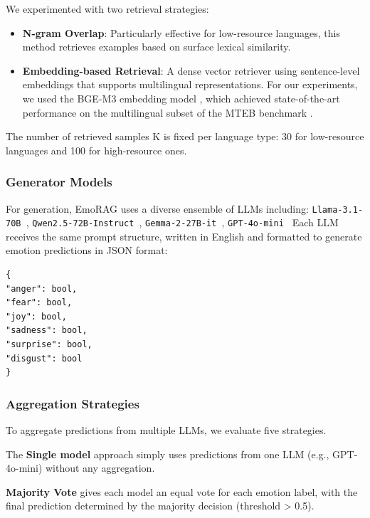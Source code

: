 \documentclass[a4paper,12pt]{extarticle}
\begin{document}
We experimented with two retrieval strategies:
\begin{itemize}
\item \textbf{N-gram Overlap}: Particularly effective for low-resource languages, this method retrieves examples based on surface lexical similarity.
\item \textbf{Embedding-based Retrieval}: A dense vector retriever using sentence-level embeddings that supports multilingual representations. For our experiments, we used the BGE-M3 embedding model \cite{chen2024bgem3embeddingmultilingualmultifunctionality}, which achieved state-of-the-art performance on the multilingual subset of the MTEB benchmark \cite{muennighoff2023mtebmassivetextembedding}.
\end{itemize}

The number of retrieved samples K is fixed per language type: 30 for low-resource languages and 100 for high-resource ones.

\subsubsection{Generator Models}

For generation, EmoRAG uses a diverse ensemble of LLMs including:
\texttt{Llama-3.1-70B \cite{grattafiori2024llama3herdmodels}}, \texttt{Qwen2.5-72B-Instruct \cite{yang2024qwen2technicalreport}}, \texttt{Gemma-2-27B-it \cite{gemmateam2024gemma2improvingopen}}, \texttt{GPT-4o-mini \cite{openai2024gpt4omini}}
Each LLM receives the same prompt structure, written in English and formatted to generate emotion predictions in JSON format:
\begin{verbatim}
{
"anger": bool,
"fear": bool,
"joy": bool,
"sadness": bool,
"surprise": bool,
"disgust": bool
}
\end{verbatim}

\subsubsection{Aggregation Strategies}

To aggregate predictions from multiple LLMs, we evaluate five strategies. 

The \textbf{Single model} approach simply uses predictions from one LLM (e.g., GPT-4o-mini) without any aggregation. 

\textbf{Majority Vote} gives each model an equal vote for each emotion label, with the final prediction determined by the majority decision (threshold > 0.5). 
\end{document}
